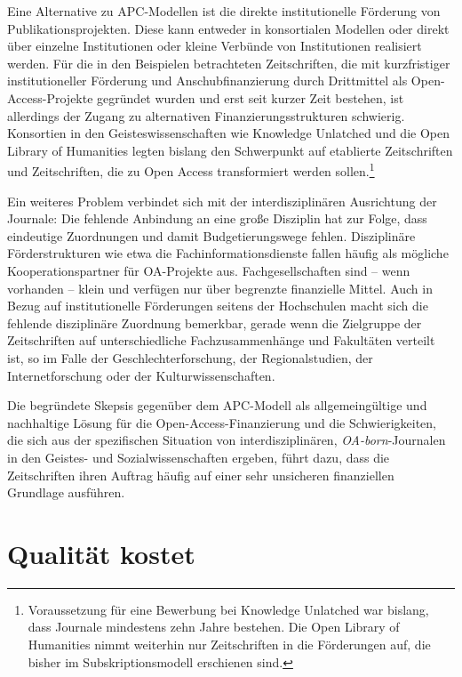 \documentclass[a4paper,
fontsize=11pt,
oneside,
numbers=noperiodatend,
parskip=half-,
bibliography=totoc,
final
]{scrartcl}
\begin{document}
Eine Alternative zu APC-Modellen ist die direkte institutionelle
Förderung von Publikationsprojekten. Diese kann entweder in konsortialen
Modellen oder direkt über einzelne Institutionen oder kleine Verbünde
von Institutionen realisiert werden. Für die in den Beispielen
betrachteten Zeitschriften, die mit kurzfristiger institutioneller
Förderung und Anschubfinanzierung durch Drittmittel als
Open-Access-Projekte gegründet wurden und erst seit kurzer Zeit
bestehen, ist allerdings der Zugang zu alternativen
Finanzierungsstrukturen schwierig. Konsortien in den
Geisteswissenschaften wie Knowledge Unlatched und die Open Library of
Humanities legten bislang den Schwerpunkt auf etablierte Zeitschriften
und Zeitschriften, die zu Open Access transformiert werden
sollen.\footnote{Voraussetzung für eine Bewerbung bei Knowledge
  Unlatched war bislang, dass Journale mindestens zehn Jahre bestehen.
  Die Open Library of Humanities nimmt weiterhin nur Zeitschriften in
  die Förderungen auf, die bisher im Subskriptionsmodell erschienen
  sind.}

Ein weiteres Problem verbindet sich mit der interdisziplinären
Ausrichtung der Journale: Die fehlende Anbindung an eine große Disziplin
hat zur Folge, dass eindeutige Zuordnungen und damit Budgetierungswege
fehlen. Disziplinäre Förderstrukturen wie etwa die
Fachinformationsdienste fallen häufig als mögliche Kooperationspartner
für OA-Projekte aus. Fachgesellschaften sind -- wenn vorhanden -- klein
und verfügen nur über begrenzte finanzielle Mittel. Auch in Bezug auf
institutionelle Förderungen seitens der Hochschulen macht sich die
fehlende disziplinäre Zuordnung bemerkbar, gerade wenn die Zielgruppe
der Zeitschriften auf unterschiedliche Fachzusammenhänge und Fakultäten
verteilt ist, so im Falle der Geschlechterforschung, der
Regionalstudien, der Internetforschung oder der Kulturwissenschaften.

Die begründete Skepsis gegenüber dem APC-Modell als allgemeingültige und
nachhaltige Lösung für die Open-Access-Finanzierung und die
Schwierigkeiten, die sich aus der spezifischen Situation von
interdisziplinären, \emph{OA-born}-Journalen in den Geistes- und
Sozialwissenschaften ergeben, führt dazu, dass die Zeitschriften ihren
Auftrag häufig auf einer sehr unsicheren finanziellen Grundlage
ausführen.

\hypertarget{qualituxe4t-kostet}{%
\section*{Qualität kostet}\label{qualituxe4t-kostet}}
\end{document}
